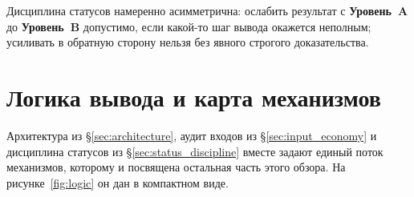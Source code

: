 \documentclass[11pt,a4paper]{article}
\newcommand{\statA}{\textbf{Уровень~A}}
\newcommand{\statB}{\textbf{Уровень~B}}
\begin{document}
Дисциплина статусов намеренно асимметрична: ослабить результат с
\statA{} до \statB{} допустимо, если какой-то шаг вывода окажется
неполным; усиливать в обратную сторону нельзя без явного строгого
доказательства.

\section{Логика вывода и карта механизмов}
\label{sec:logic}

Архитектура из \S\ref{sec:architecture}, аудит входов из
\S\ref{sec:input_economy} и дисциплина статусов из
\S\ref{sec:status_discipline} вместе задают единый поток
механизмов, которому и посвящена остальная часть этого обзора.
На рисунке~\ref{fig:logic} он дан в компактном виде.
\end{document}
